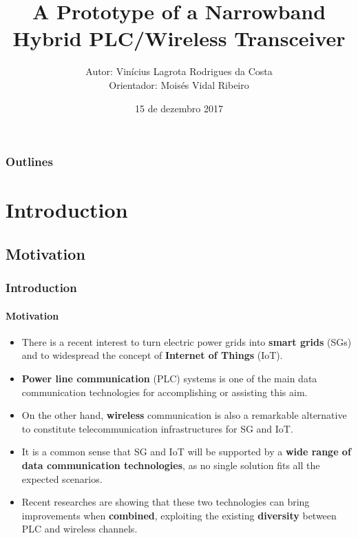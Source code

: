 \documentclass[mathserif]{beamer}
\title[NB hybrid PLC/Wireless transceiver prototype]{A Prototype of a Narrowband Hybrid PLC/Wireless Transceiver}
\author[Vinícius Lagrota]{Autor: Vinícius Lagrota Rodrigues da Costa\\
	Orientador: Moisés Vidal Ribeiro}
\institute[UFJF]{Programa de Pós-Graduação em Engenharia Elétrica\\
	Universidade Federal de Juiz de Fora}
\date{15 de dezembro 2017}
\newcommand{\wait}{\vfill}
\begin{document}
\begin{frame}
\maketitle 
\end{frame}

\begin{frame}
\frametitle{Outlines}
\small
\tableofcontents
\end{frame}

\section{Introduction}
\subsection{Motivation}
\begin{frame}
	\frametitle{Introduction}
	\framesubtitle{Motivation}

	\small
	\begin{itemize}		
		\item There is a recent interest to turn electric power grids into \textbf{smart grids} (SGs) and to widespread the concept of \textbf{Internet of Things} (IoT). \wait
		\item \textbf{Power line communication} (PLC) systems is one of the main data communication technologies for accomplishing or assisting this aim. \wait
		\item On the other hand, \textbf{wireless} communication is also a remarkable alternative to constitute telecommunication infrastructures for SG and IoT. \wait
		\item It is a common sense that SG and IoT will be supported by a \textbf{wide range of data communication technologies}, as no single solution fits all the expected scenarios. \wait
		\item Recent researches are showing that these two technologies can bring improvements when \textbf{combined}, exploiting the existing \textbf{diversity} between PLC and wireless channels.
		
	\end{itemize}
\end{frame}
\end{document}
